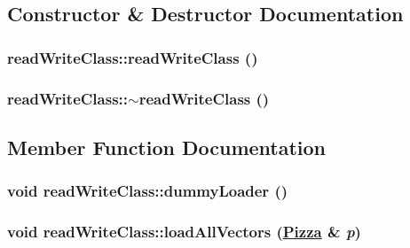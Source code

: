 \subsection{Constructor \& Destructor Documentation}
\hypertarget{classread_write_class_6db1c799fac571a924d5f276094c2b5c}{
\subsubsection[readWriteClass]{\setlength{\rightskip}{0pt plus 5cm}read\-Write\-Class::read\-Write\-Class ()}}
\label{classread_write_class_6db1c799fac571a924d5f276094c2b5c}


\hypertarget{classread_write_class_17d5dddd8a25946f62055c4d78fb22d8}{
\subsubsection[$\sim$readWriteClass]{\setlength{\rightskip}{0pt plus 5cm}read\-Write\-Class::$\sim$read\-Write\-Class ()}}
\label{classread_write_class_17d5dddd8a25946f62055c4d78fb22d8}




\subsection{Member Function Documentation}
\hypertarget{classread_write_class_a73e0ba1f66bb2de1f0f36586b54afc7}{
\subsubsection[dummyLoader]{\setlength{\rightskip}{0pt plus 5cm}void read\-Write\-Class::dummy\-Loader ()}}
\label{classread_write_class_a73e0ba1f66bb2de1f0f36586b54afc7}


\hypertarget{classread_write_class_7a6da2d64d652963e15693695f38b019}{
\subsubsection[loadAllVectors]{\setlength{\rightskip}{0pt plus 5cm}void read\-Write\-Class::load\-All\-Vectors (\hyperlink{class_pizza}{Pizza} \& {\em p})}}
\label{classread_write_class_7a6da2d64d652963e15693695f38b019}


